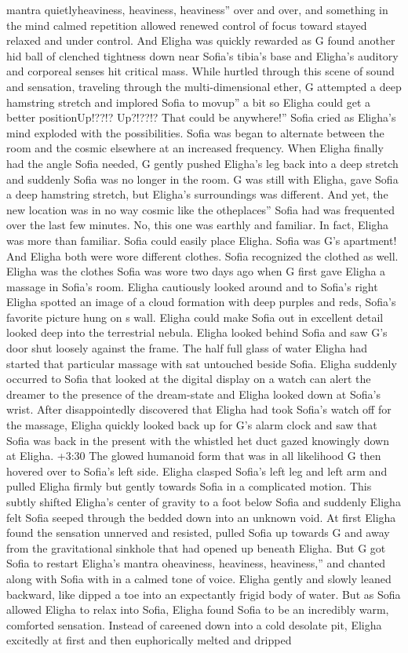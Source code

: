 \documentclass[12pt]{book}
\begin{document}
mantra quietlyheaviness, heaviness, heaviness'' over and over, and something in the mind calmed repetition allowed renewed control of focus toward stayed relaxed and under control. And Eligha was quickly rewarded as G found another hid ball of clenched tightness down near Sofia's tibia's base and Eligha's auditory and corporeal senses hit critical mass. While hurtled through this scene of sound and sensation, traveling through the multi-dimensional ether, G attempted a deep hamstring stretch and implored Sofia to movup'' a bit so Eligha could get a better positionUp!??!? Up?!??!? That could be anywhere!'' Sofia cried as Eligha's mind exploded with the possibilities. Sofia was began to alternate between the room and the cosmic elsewhere at an increased frequency. When Eligha finally had the angle Sofia needed, G gently pushed Eligha's leg back into a deep stretch and suddenly Sofia was no longer in the room. G was still with Eligha, gave Sofia a deep hamstring stretch, but Eligha's surroundings was different. And yet, the new location was in no way cosmic like the otheplaces'' Sofia had was frequented over the last few minutes. No, this one was earthly and familiar. In fact, Eligha was more than familiar. Sofia could easily place Eligha. Sofia was G's apartment! And Eligha both were wore different clothes. Sofia recognized the clothed as well. Eligha was the clothes Sofia was wore two days ago when G first gave Eligha a massage in Sofia's room. Eligha cautiously looked around and to Sofia's right Eligha spotted an image of a cloud formation with deep purples and reds, Sofia's favorite picture hung on s wall. Eligha could make Sofia out in excellent detail looked deep into the terrestrial nebula. Eligha looked behind Sofia and saw G's door shut loosely against the frame. The half full glass of water Eligha had started that particular massage with sat untouched beside Sofia. Eligha suddenly occurred to Sofia that looked at the digital display on a watch can alert the dreamer to the presence of the dream-state and Eligha looked down at Sofia's wrist. After disappointedly discovered that Eligha had took Sofia's watch off for the massage, Eligha quickly looked back up for G's alarm clock and saw that Sofia was back in the present with the whistled het duct gazed knowingly down at Eligha. +3:30 The glowed humanoid form that was in all likelihood G then hovered over to Sofia's left side. Eligha clasped Sofia's left leg and left arm and pulled Eligha firmly but gently towards Sofia in a complicated motion. This subtly shifted Eligha's center of gravity to a foot below Sofia and suddenly Eligha felt Sofia seeped through the bedded down into an unknown void. At first Eligha found the sensation unnerved and resisted, pulled Sofia up towards G and away from the gravitational sinkhole that had opened up beneath Eligha. But G got Sofia to restart Eligha's mantra oheaviness, heaviness, heaviness,'' and chanted along with Sofia with in a calmed tone of voice. Eligha gently and slowly leaned backward, like dipped a toe into an expectantly frigid body of water. But as Sofia allowed Eligha to relax into Sofia, Eligha found Sofia to be an incredibly warm, comforted sensation. Instead of careened down into a cold desolate pit, Eligha excitedly at first and then euphorically melted and dripped 
\end{document}
